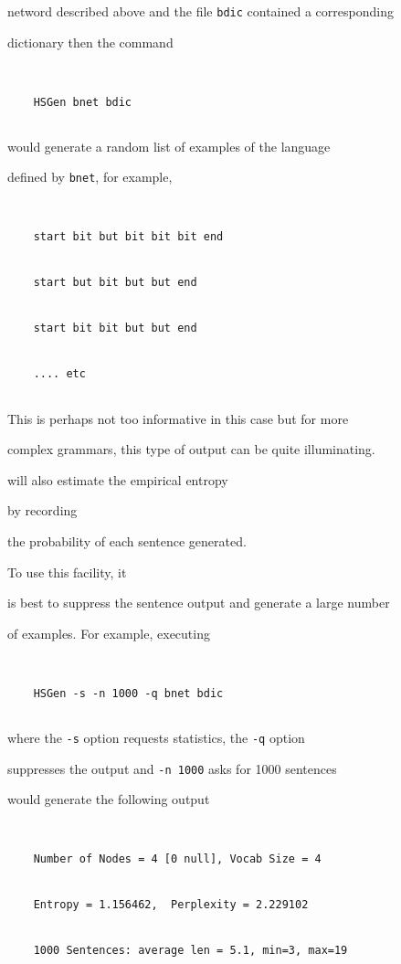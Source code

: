 netword described above and the file \texttt{bdic} contained a corresponding


dictionary then the command


\begin{verbatim}


    HSGen bnet bdic


\end{verbatim}


would generate a random list of examples of the language


defined by  \texttt{bnet}, for example,


\begin{verbatim}


    start bit but bit bit bit end 


    start but bit but but end 


    start bit bit but but end 


    .... etc


\end{verbatim}


This is perhaps not too informative in this case but for more


complex grammars, this type of output can be quite illuminating.





 will also estimate the empirical entropy


by recording


the probability of each sentence generated.  


To use this facility, it


is best to suppress the sentence output and generate a large number


of examples.  For example, executing


\begin{verbatim}


    HSGen -s -n 1000 -q bnet bdic


\end{verbatim}


where the \texttt{-s} option requests statistics, the \texttt{-q} option


suppresses the output and \texttt{-n 1000} asks for 1000 sentences


would generate the following output


\begin{verbatim}


    Number of Nodes = 4 [0 null], Vocab Size = 4


    Entropy = 1.156462,  Perplexity = 2.229102


    1000 Sentences: average len = 5.1, min=3, max=19


\end{verbatim}





